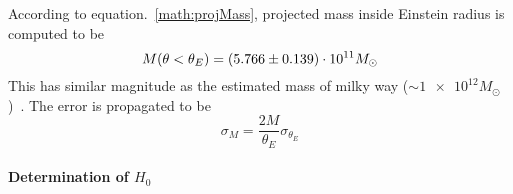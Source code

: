 According to equation.~\ref{math:projMass}, projected mass inside Einstein radius is computed to be
\begin{equation}
	M(\theta < \theta_E) = (\num{5.766 +- 0.139}) \cdot 10^{11} M_\odot
\end{equation}
This has similar magnitude as the estimated mass of milky way ($\sim \num{1e12} M_\odot$)~\cite{Grand_2019}. The error is propagated to be
\begin{equation*}
	\sigma_{M} = \frac{2M}{\theta_E} \sigma_{\theta_E}
\end{equation*}

\paragraph{Determination of $H_0$}
